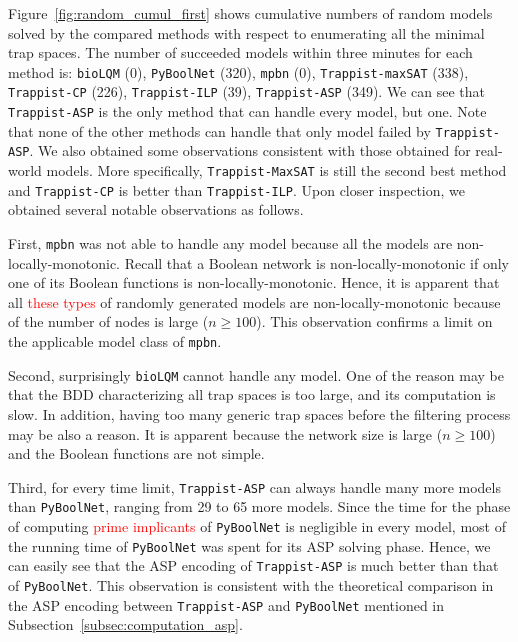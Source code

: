\documentclass[preprint,12pt]{elsarticle}
\newcommand{\change}[1]{\textcolor{red}{#1}}
\begin{document}
Figure~\ref{fig:random_cumul_first} shows cumulative numbers of random models solved by the compared methods with respect to enumerating all the minimal trap spaces.
The number of succeeded models within three minutes for each method is: \texttt{bioLQM} (0), \texttt{PyBoolNet} (320), \texttt{mpbn} (0), \texttt{Trappist-maxSAT} (338), \texttt{Trappist-CP} (226), \texttt{Trappist-ILP} (39), \texttt{Trappist-ASP} (349).
We can see that \texttt{Trappist-ASP} is the only method that can handle every model, but one.
Note that none of the other methods can handle that only model failed by \texttt{Trappist-ASP}.
We also obtained some observations consistent with those obtained for real-world models.
More specifically, \texttt{Trappist-MaxSAT} is still the second best method and \texttt{Trappist-CP} is better than \texttt{Trappist-ILP}.
Upon closer inspection, we obtained several notable observations as follows.

First, \texttt{mpbn} was not able to handle any model because all the models are non-locally-monotonic.
Recall that a Boolean network is non-locally-monotonic if only one of its Boolean functions is non-locally-monotonic.
Hence, it is apparent that all \change{these types} of randomly generated models are non-locally-monotonic because of the number of nodes is large (\(n \geq 100\)).
This observation confirms a limit on the applicable model class of \texttt{mpbn}.

Second, surprisingly \texttt{bioLQM} cannot handle any model.
One of the reason may be that the BDD characterizing all trap spaces is too large, and its computation is slow.
In addition, having too many generic trap spaces before the filtering process may be also a reason.
It is apparent because the network size is large (\(n \geq 100\)) and the Boolean functions are not simple.

Third, for every time limit, \texttt{Trappist-ASP} can always handle many more models than \texttt{PyBoolNet}, ranging from 29 to 65 more models.
Since the time for the phase of computing \change{prime implicants} of \texttt{PyBoolNet} is negligible in every model, most of the running time of \texttt{PyBoolNet} was spent for its ASP solving phase.
Hence, we can easily see that the ASP encoding of \texttt{Trappist-ASP} is much better than that of \texttt{PyBoolNet}.
This observation is consistent with the theoretical comparison in the ASP encoding between \texttt{Trappist-ASP} and \texttt{PyBoolNet} mentioned in Subsection~\ref{subsec:computation_asp}.

\end{document}

